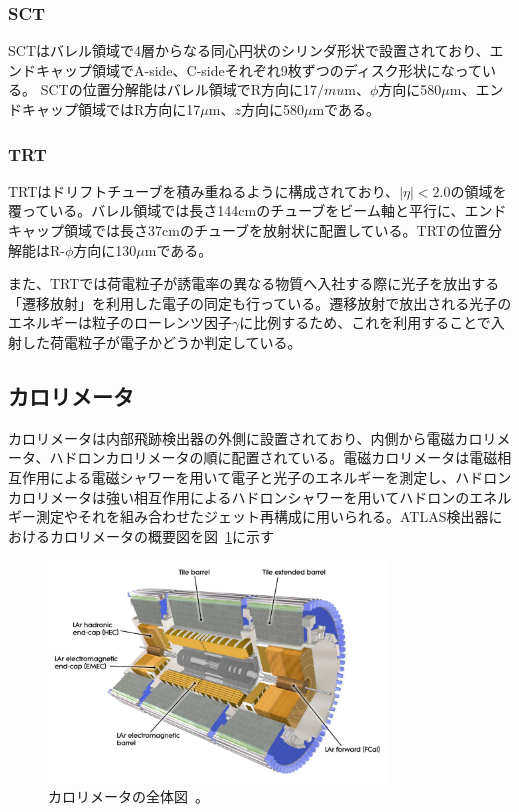 \subsubsection{SCT}
SCTはバレル領域で4層からなる同心円状のシリンダ形状で設置されており、エンドキャップ領域でA-side、C-sideそれぞれ9枚ずつのディスク形状になっている。
SCTの位置分解能はバレル領域でR方向に17$/mu$m、$\phi$方向に580$\mu$m、エンドキャップ領域ではR方向に17$\mu$m、$z$方向に580$\mu$mである。


\subsubsection{TRT}
TRTはドリフトチューブを積み重ねるように構成されており、$|\eta|<2.0$の領域を覆っている。バレル領域では長さ144cmのチューブをビーム軸と平行に、エンドキャップ領域では長さ37cmのチューブを放射状に配置している。TRTの位置分解能はR-$\phi$方向に130$\mu$mである。

また、TRTでは荷電粒子が誘電率の異なる物質へ入社する際に光子を放出する「遷移放射」を利用した電子の同定も行っている。遷移放射で放出される光子のエネルギーは粒子のローレンツ因子$\gamma$に比例するため、これを利用することで入射した荷電粒子が電子かどうか判定している。

\subsection{カロリメータ}\label{2-2-4}
カロリメータは内部飛跡検出器の外側に設置されており、内側から電磁カロリメータ、ハドロンカロリメータの順に配置されている。電磁カロリメータは電磁相互作用による電磁シャワーを用いて電子と光子のエネルギーを測定し、ハドロンカロリメータは強い相互作用によるハドロンシャワーを用いてハドロンのエネルギー測定やそれを組み合わせたジェット再構成に用いられる。ATLAS検出器におけるカロリメータの概要図を図~\ref{fig:2-10}に示す

\begin{figure}[h]
  \centering
  \includegraphics[clip, width=9cm]{fig/2/Calorimeter_d3.pdf}
  \caption{カロリメータの全体図~\cite{Aad:1129811}。}
  \label{fig:2-10}
\end{figure}

